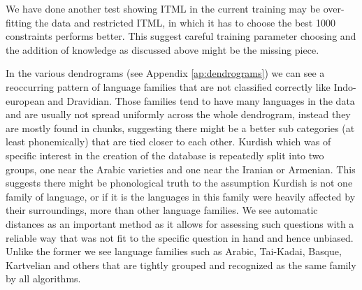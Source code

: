 \documentclass[letterpaper, 11pt]{article}
\begin{document}
We have done another test showing ITML in the current training may be over-fitting the data and restricted ITML, in which it has to choose the best 1000 constraints performs better. This suggest careful training parameter choosing and the addition of knowledge as discussed above might be the missing piece.
\begin{table}[]
	\centering
	
	\caption{Top measures and their performance with different clustering evaluation scores. Itml reported is with training over 50\% of the languages\label{tab:indexes}}
\end{table}

In the various dendrograms (see Appendix \ref{ap:dendrograms}) we can see a reoccurring pattern of language families that are not classified correctly like Indo-european and Dravidian. Those families tend to have many languages in the data and are usually not spread uniformly across the whole dendrogram, instead they are mostly found in chunks, suggesting there might be a better sub categories (at least phonemically) that are tied closer to each other. Kurdish which was of specific interest in the creation of the database is repeatedly split into two groups, one near the Arabic varieties and one near the Iranian or Armenian. This suggests there might be phonological truth to the assumption Kurdish is not one family of language, or if it is the languages in this family were heavily affected by their surroundings, more than other language families. We see automatic distances as an important method as it allows for assessing such questions with a reliable way that was not fit to the specific question in hand and hence unbiased. Unlike the former we see language families such as Arabic, Tai-Kadai, Basque, Kartvelian and others that are tightly grouped and recognized as the same family by all algorithms.
\end{document}
